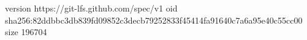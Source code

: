 version https://git-lfs.github.com/spec/v1
oid sha256:82ddbbc3db839fd09852c3decb79252833f45414fa91640c7a6a95e40c55cc00
size 196704
